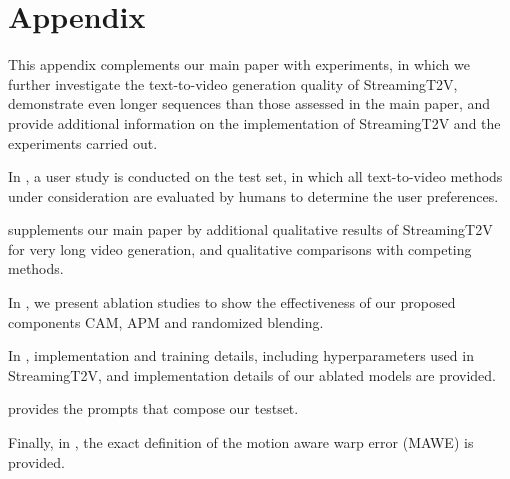 \newpage
\section*{\Large Appendix}


This appendix complements our main paper with experiments, in which we further investigate the text-to-video generation quality of StreamingT2V, demonstrate even longer sequences than those assessed  in the main paper, and provide additional information on the implementation of StreamingT2V and the experiments carried out.

In , a user study is conducted on the test set, in which all  text-to-video methods under consideration are evaluated by humans to determine the user preferences.

 supplements our main paper by additional qualitative results of StreamingT2V for very long video generation, and qualitative comparisons with competing methods. 

In , we present ablation studies to show the effectiveness of our proposed components CAM, APM and randomized blending.

In , implementation and training details, including hyperparameters used in StreamingT2V, and implementation details of our ablated models are provided.

 provides the prompts that compose our testset.

Finally, in , the exact definition of the motion aware warp error (MAWE) is provided.



